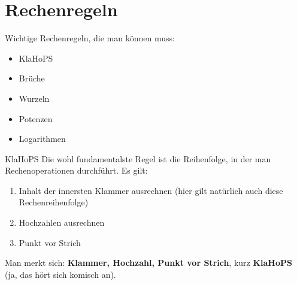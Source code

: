 \chapter{Rechenregeln}

\begin{inhalt}
  Wichtige Rechenregeln, die man können muss:
  \begin{itemize}
    \item KlaHoPS
    \item Brüche
    \item Wurzeln
    \item Potenzen
    \item Logarithmen
  \end{itemize}
\end{inhalt}

\begin{bla}{KlaHoPS}
  Die wohl fundamentalste Regel ist die Reihenfolge, in der man Rechenoperationen durchführt. Es gilt:
  \begin{enumerate}
    \item Inhalt der innersten Klammer ausrechnen (hier gilt natürlich auch diese Rechenreihenfolge)
    \item Hochzahlen ausrechnen
    \item Punkt vor Strich
  \end{enumerate}
  Man merkt sich: \textbf{Klammer, Hochzahl, Punkt vor Strich}, kurz \textbf{KlaHoPS} (ja, das hört sich komisch an).
\end{bla}

